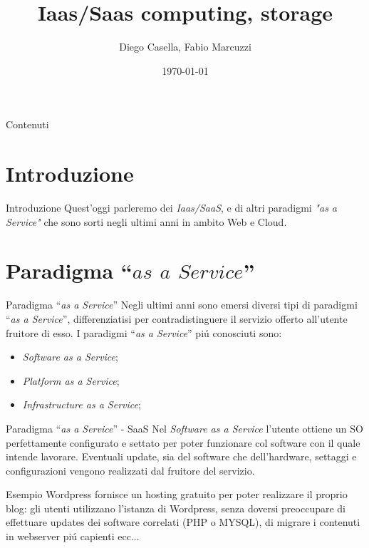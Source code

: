 \documentclass{beamer}
\title{Iaas/Saas computing, storage}
\author{Diego Casella, Fabio Marcuzzi}
\date{\today}
\begin{document}
\maketitle

\begin{frame}{Contenuti} %
\tableofcontents
\end{frame}

\section{Introduzione}
\begin{frame}{Introduzione}
Quest'oggi parleremo dei \emph{Iaas/SaaS}, e di altri paradigmi \emph{"as a Service"} che sono sorti negli ultimi anni in ambito Web e Cloud.


\end{frame}


\section{Paradigma ``$as$ $a$ $Service$''}
\begin{frame}{Paradigma ``\emph{as a Service}''}
 Negli ultimi anni sono emersi diversi tipi di paradigmi ``\emph{as a Service}'', differenziatisi per contradistinguere il servizio
 offerto all'utente fruitore di esso. I paradigmi ``\emph{as a Service}'' pi\'u conosciuti sono:
 \begin{itemize}
\item \emph{Software as a Service};
\item \emph{Platform as a Service};
\item \emph{Infrastructure as a Service};
\end{itemize}
\end{frame}

\begin{frame}{Paradigma ``\emph{as a Service}'' - SaaS}
Nel \emph{Software as a Service} l'utente ottiene un SO perfettamente configurato e settato per poter funzionare col
software con il quale intende lavorare. Eventuali update, sia del software che dell'hardware, settaggi e configurazioni vengono
realizzati dal fruitore del servizio.
\begin{exampleblock}{Esempio}
Wordpress fornisce un hosting gratuito per poter realizzare il proprio blog: gli utenti utilizzano l'istanza di Wordpress, senza
doversi preoccupare di effettuare updates dei software correlati (PHP o MYSQL), di migrare i contenuti in webserver pi\'u
capienti ecc...
\end{exampleblock}
\end{frame}
\end{document}
